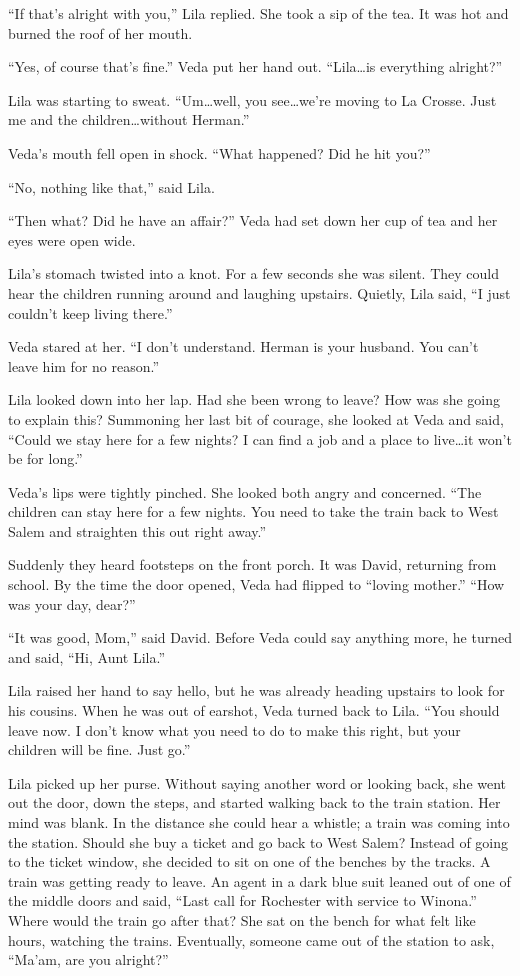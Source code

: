 \documentclass[
  letterpaper,
]{book}
\begin{document}
``If that's alright with you,'' Lila replied. She took a sip of the tea.
It was hot and burned the roof of her mouth.

``Yes, of course that's fine.'' Veda put her hand out. ``Lila\ldots is
everything alright?''

Lila was starting to sweat. ``Um\ldots well, you see\ldots we're moving
to La Crosse. Just me and the children\ldots without Herman.''

Veda's mouth fell open in shock. ``What happened? Did he hit you?''

``No, nothing like that,'' said Lila.

``Then what? Did he have an affair?'' Veda had set down her cup of tea
and her eyes were open wide.

Lila's stomach twisted into a knot. For a few seconds she was silent.
They could hear the children running around and laughing upstairs.
Quietly, Lila said, ``I just couldn't keep living there.''

Veda stared at her. ``I don't understand. Herman is your husband. You
can't leave him for no reason.''

Lila looked down into her lap. Had she been wrong to leave? How was she
going to explain this? Summoning her last bit of courage, she looked at
Veda and said, ``Could we stay here for a few nights? I can find a job
and a place to live\ldots it won't be for long.''

Veda's lips were tightly pinched. She looked both angry and concerned.
``The children can stay here for a few nights. You need to take the
train back to West Salem and straighten this out right away.''

Suddenly they heard footsteps on the front porch. It was David,
returning from school. By the time the door opened, Veda had flipped to
``loving mother.'' ``How was your day, dear?''

``It was good, Mom,'' said David. Before Veda could say anything more,
he turned and said, ``Hi, Aunt Lila.''

Lila raised her hand to say hello, but he was already heading upstairs
to look for his cousins. When he was out of earshot, Veda turned back to
Lila. ``You should leave now. I don't know what you need to do to make
this right, but your children will be fine. Just go.''

Lila picked up her purse. Without saying another word or looking back,
she went out the door, down the steps, and started walking back to the
train station. Her mind was blank. In the distance she could hear a
whistle; a train was coming into the station. Should she buy a ticket
and go back to West Salem? Instead of going to the ticket window, she
decided to sit on one of the benches by the tracks. A train was getting
ready to leave. An agent in a dark blue suit leaned out of one of the
middle doors and said, ``Last call for Rochester with service to
Winona.'' Where would the train go after that? She sat on the bench for
what felt like hours, watching the trains. Eventually, someone came out
of the station to ask, ``Ma'am, are you alright?''
\end{document}
